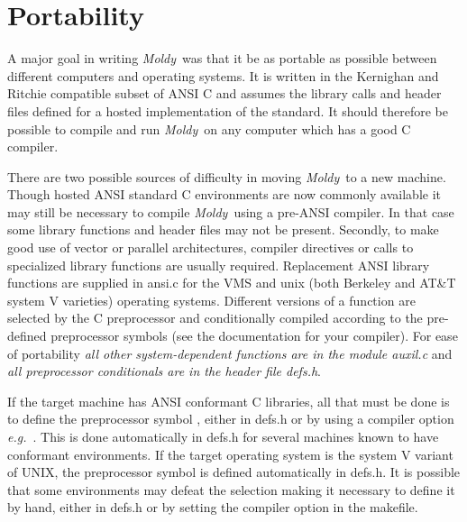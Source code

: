 \documentclass[a4paper,twoside]{report}
\newcommand{\Fname}[1]{{\upshape\mdseries\sffamily#1}}
\newcommand{\moldy}{\emph{Moldy}}
\newcommand{\eg}{\emph{e.g.}}
\begin{document}
\section{Portability}%
A major goal in writing \moldy\ was that it be as portable as possible
between different computers and operating systems.  It is written in
the Kernighan and Ritchie\cite{kernighan:78} compatible subset of ANSI
C and assumes the library calls and header files defined for a hosted
implementation of the standard.  It should therefore be possible to
compile and run \moldy\ on any computer which has a good C compiler.

There are two possible sources of difficulty in moving \moldy\ to a
new machine. Though hosted ANSI standard C environments are now
commonly available it may still be necessary to compile \moldy\ using
a pre-ANSI compiler.  In that case some library functions and header
files may not be present. Secondly, to make good use of vector or
parallel architectures, compiler directives or calls to specialized
library functions are usually required.  Replacement ANSI library
functions are supplied in \Fname{ansi.c} for the VMS and unix (both
Berkeley and AT\&T system V varieties) operating systems.  Different
versions of a function are selected by the C preprocessor and
conditionally compiled according to the pre-defined preprocessor
symbols (see the documentation for your compiler).  For ease of
portability \emph{all other system-dependent functions are in the
  module \Fname{auxil.c}} and \emph{all preprocessor conditionals are in
  the header file \Fname{defs.h}}.

If the target machine has ANSI conformant C libraries, all that must
be done is to define the preprocessor symbol ,
either in \Fname{defs.h} or by using a compiler option \eg\ 
.  This is done automatically in \Fname{defs.h}
for several machines known to have conformant environments.  If the
target operating system is the system V variant of UNIX, the
preprocessor symbol  is defined automatically in
\Fname{defs.h}.  It is possible that some environments may defeat the
selection making it necessary to define it by hand, either in
\Fname{defs.h} or by setting the compiler option  in
the makefile.
\end{document}
